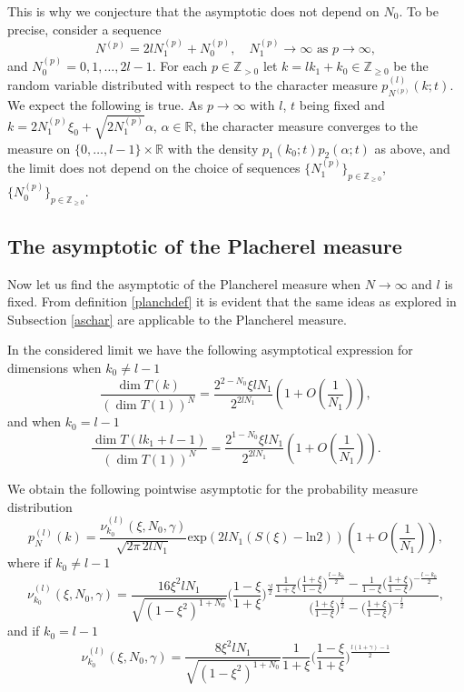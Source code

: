 \documentclass[11pt]{amsart}
\begin{document}
This is why we conjecture that the asymptotic does not depend on $N_0$. To be precise, consider a sequence
$$
N^{(p)}=2lN_1^{(p)}+N_0^{(p)},\quad N_1^{(p)}\to\infty\text{ as }p\to\infty,
$$
and $N_0^{(p)}=0,1,\ldots,2l-1$. For each $p\in\mathbb{Z}_{>0}$ let $k=lk_1+k_0\in\mathbb{Z}_{\geq 0}$ be the random variable distributed with respect to the character measure $p_{N^{(p)}}^{(l)}(k;t)$. We expect the following is true. As $p\to\infty$ with $l$, $t$ being fixed and $k=2N_1^{(p)}\xi_0+\sqrt{2N_1^{(p)}}\alpha$, $\alpha\in\mathbb{R}$, the character measure converges to the measure on $\{0,\ldots,l-1\}\times\mathbb{R}$ with the density $p_1(k_0;t)p_2(\alpha;t)$ as above, and the limit does not depend on the choice of sequences $\{N_1^{(p)}\}_{p\in\mathbb{Z}_{\geq 0}}$, $\{N_0^{(p)}\}_{p\in\mathbb{Z}_{\geq 0}}$.



\subsection{The asymptotic of the Placherel measure}
Now let us find the asymptotic of the Plancherel measure when $N\to\infty$ and $l$ is fixed. From definition \ref{planchdef} it is evident that the same ideas as explored in Subsection \ref{aschar} are applicable to the Plancherel measure.


In the considered limit we have the following asymptotical expression for dimensions when $k_0\neq l-1$
\begin{equation*}
\frac{\dim T(k)}{(\dim  T(1))^N}=\frac{2^{2-N_0}\xi l N_1}{2^{2lN_1}}\left(1+O\left(\frac{1}{N_1}\right)\right),
\end{equation*}
and when $k_0=l-1$
\begin{equation*}
\frac{\dim T(lk_1+l-1)}{(\dim  T(1))^N}=\frac{2^{1-N_0}\xi l N_1}{2^{2lN_1}}\left(1+O\left(\frac{1}{N_1}\right)\right).
\end{equation*}


We obtain the following pointwise asymptotic for the probability measure distribution
\begin{equation}\label{Planchas}
    p^{(l)}_N(k)=\frac{\nu^{(l)}_{k_0}(\xi,N_0,\gamma)}{\sqrt{2\pi\,2lN_1}}\mathrm{exp}(2lN_1(S(\xi)-\mathrm{ln}2))\left(1+O\left(\frac{1}{N_1}\right)\right),
\end{equation}
where if $k_0\neq l-1$
\begin{equation*}
    \nu^{(l)}_{k_0}(\xi,N_0,\gamma)=\frac{16\xi^2lN_1}{\sqrt{(1-\xi^2)^{1+N_0}}}\Big(\frac{1-\xi}{1+\xi}\Big)^{\frac{\gamma l}{2}}\frac{\frac{1}{1+\xi}\Big(\frac{1+\xi}{1-\xi}\Big)^{\frac{l-k_0}{2}}-\frac{1}{1-\xi}\Big(\frac{1+\xi}{1-\xi}\Big)^{-\frac{l-k_0}{2}}}{\Big(\frac{1+\xi}{1-\xi}\Big)^{\frac{l}{2}}-\Big(\frac{1+\xi}{1-\xi}\Big)^{-\frac{l}{2}}},
\end{equation*}
and if $k_0=l-1$
\begin{equation*}
    \nu^{(l)}_{k_0}(\xi,N_0,\gamma)=\frac{8\xi^2 lN_1}{\sqrt{(1-\xi^2)^{1+N_0}}}\frac{1}{1+\xi}\Big(\frac{1-\xi}{1+\xi}\Big)^{\frac{l(1+\gamma)-1}{2}}
\end{equation*}
\end{document}
